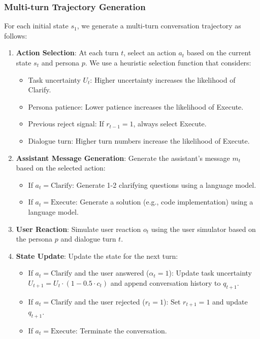 \subsubsection{Multi-turn Trajectory Generation}

For each initial state $s_1$, we generate a multi-turn conversation trajectory as follows:

\begin{enumerate}
    \item \textbf{Action Selection}: At each turn $t$, select an action $a_t$ based on the current state $s_t$ and persona $p$. We use a heuristic selection function that considers:
    \begin{itemize}
        \item Task uncertainty $U_t$: Higher uncertainty increases the likelihood of Clarify.
        \item Persona patience: Lower patience increases the likelihood of Execute.
        \item Previous reject signal: If $r_{t-1} = 1$, always select Execute.
        \item Dialogue turn: Higher turn numbers increase the likelihood of Execute.
    \end{itemize}
    
    \item \textbf{Assistant Message Generation}: Generate the assistant's message $m_t$ based on the selected action:
    \begin{itemize}
        \item If $a_t = \text{Clarify}$: Generate 1-2 clarifying questions using a language model.
        \item If $a_t = \text{Execute}$: Generate a solution (e.g., code implementation) using a language model.
    \end{itemize}
    
    \item \textbf{User Reaction}: Simulate user reaction $o_t$ using the user simulator based on the persona $p$ and dialogue turn $t$.
    
    \item \textbf{State Update}: Update the state for the next turn:
    \begin{itemize}
        \item If $a_t = \text{Clarify}$ and the user answered ($\alpha_t = 1$): Update task uncertainty $U_{t+1} = U_t \cdot (1 - 0.5 \cdot c_t)$ and append conversation history to $q_{t+1}$.
        \item If $a_t = \text{Clarify}$ and the user rejected ($r_t = 1$): Set $r_{t+1} = 1$ and update $q_{t+1}$.
        \item If $a_t = \text{Execute}$: Terminate the conversation.
    \end{itemize}
    

\end{enumerate}
